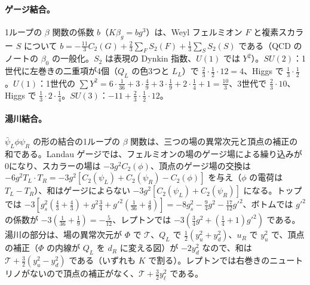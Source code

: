 \documentclass[a4paper,10pt]{ltjsarticle}
\begin{document}
\paragraph{ゲージ結合。}1ループの $\beta$ 関数の係数 $b$（$K\beta_g=bg^3$）は、Weyl フェルミオン $F$ と複素スカラー $S$ について $b=-\frac{11}3C_2(G)+\frac23\sum_FS_2(F)+\frac13\sum_SS_2(S)$ である（QCD のノートの $\beta_0$ の一般化。$S_2$ は表現の Dynkin 指数、$U(1)$ では $Y^2$）。$SU(2)$：1世代に左巻きの二重項が4個（$Q_L$ の色3つと $L_L$）で $\frac23\cdot\frac12\cdot12=4$、Higgs で $\frac13\cdot\frac12$。$U(1)$：1世代の $\sum Y^2=6\cdot\frac1{36}+3\cdot\frac49+3\cdot\frac19+2\cdot\frac14+1=\frac{10}3$、3世代で $\frac23\cdot10$、Higgs で $\frac13\cdot2\cdot\frac14$。$SU(3)$：$-11+\frac23\cdot\frac12\cdot12$。

\paragraph{湯川結合。}$\bar\psi_L\phi\psi_R$ の形の結合の1ループの $\beta$ 関数は、三つの場の異常次元と頂点の補正の和である。Landau ゲージでは、フェルミオンの場のゲージ場による繰り込みが0になり、スカラーの場は $-3g^2C_2(\phi)$、頂点のゲージ場の交換は $-6g^2T_L\cdot T_R=-3g^2[C_2(\psi_L)+C_2(\psi_R)-C_2(\phi)]$ を与え（$\phi$ の電荷は $T_L-T_R$）、和はゲージによらない $-3g^2[C_2(\psi_L)+C_2(\psi_R)]$ になる。トップでは $-3[g_s^2(\frac43+\frac43)+g^2\frac34+g'^2(\frac1{36}+\frac49)]=-8g_s^2-\frac94g^2-\frac{17}{12}g'^2$、ボトムでは $g'^2$ の係数が $-3(\frac1{36}+\frac19)=-\frac5{12}$、レプトンでは $-3(\frac34g^2+(\frac14+1)g'^2)$ である。湯川の部分は、場の異常次元が $\Phi$ で $\mathcal T$、$Q_L$ で $\frac12(y_u^2+y_d^2)$、$u_R$ で $y_u^2$ で、頂点の補正（$\Phi$ の内線が $Q_L$ を $d_R$ に変える図）が $-2y_d^2$ なので、和は $\mathcal T+\frac32(y_u^2-y_d^2)$ である（いずれも $K$ で割る）。レプトンでは右巻きのニュートリノがないので頂点の補正がなく、$\mathcal T+\frac32y_\ell^2$ である。
\end{document}
